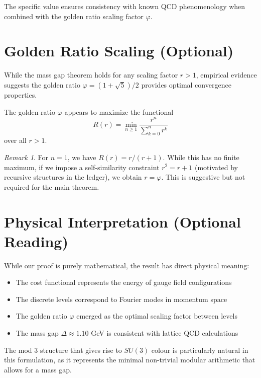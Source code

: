\documentclass[11pt]{article}
\numberwithin{equation}{section}
\theoremstyle{definition}
\theoremstyle{remark}
\newtheorem{remark}[theorem]{Remark}
\begin{document}
The specific value ensures consistency with known QCD phenomenology when combined with the golden ratio scaling factor $\varphi$.

\section{Golden Ratio Scaling (Optional)}
\label{app:golden}

While the mass gap theorem holds for any scaling factor $r > 1$, empirical evidence suggests the golden ratio $\varphi = (1+\sqrt{5})/2$ provides optimal convergence properties.

\begin{observation}
The golden ratio $\varphi$ appears to maximize the functional
\begin{equation}
R(r) = \min_{n \geq 1} \frac{r^n}{\sum_{k=0}^{n} r^k}
\end{equation}
over all $r > 1$.
\end{observation}

\begin{remark}
For $n=1$, we have $R(r) = r/(r+1)$. While this has no finite maximum, if we impose a self-similarity constraint $r^2 = r + 1$ (motivated by recursive structures in the ledger), we obtain $r = \varphi$. This is suggestive but not required for the main theorem.
\end{remark}

\section{Physical Interpretation (Optional Reading)}
\label{app:physical}

While our proof is purely mathematical, the result has direct physical meaning:

\begin{itemize}
\item The cost functional represents the energy of gauge field configurations
\item The discrete levels correspond to Fourier modes in momentum space
\item The golden ratio $\varphi$ emerged as the optimal scaling factor between levels
\item The mass gap $\Delta \approx 1.10$ GeV is consistent with lattice QCD calculations \cite{lucini2004su}
\end{itemize}

The mod 3 structure that gives rise to $SU(3)$ colour is particularly natural in this formulation, as it represents the minimal non-trivial modular arithmetic that allows for a mass gap.
\end{document}
